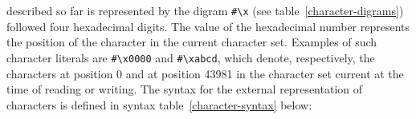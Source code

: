 \begin{optDefinition}
described so far is represented by the digram \verb+#\x+ (see
table~\ref{character-digrams}) followed four hexadecimal digits.  The value of
the hexadecimal number represents the position of the character in the current
character set.  Examples of such character literals are \verb+#\x0000+ and
\verb+#\xabcd+, which denote, respectively, the characters at position 0 and at
position 43981 in the character set current at the time of reading or writing.
The syntax for the external representation of characters is defined in syntax
table~\ref{character-syntax} below:
%
\Syntax
\label{character-syntax}
%


\end{optDefinition}
